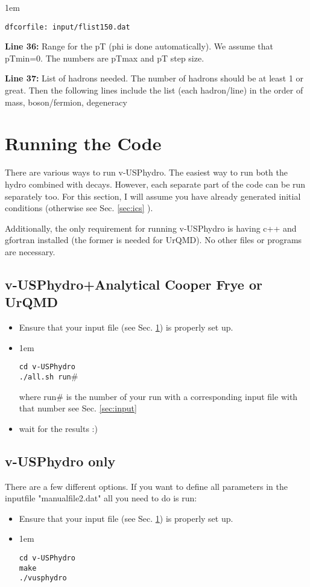 \documentclass[article]{revtex4-1}
\newcommand{\code}[1]{\bigskip\noindent\begin{addmargin}[3em]{1em}\begin{linenumbers}\texttt{#1}\end{linenumbers}\end{addmargin}\bigskip}
\begin{document}
\code{df\textunderscore cor\textunderscore file: input/flist150.dat }

{\bf Line 36:} Range for the pT (phi is done automatically).  We assume that pTmin=0.  The numbers are pTmax and pT step size.

{\bf Line 37:} List of hadrons needed.  The number of hadrons should be at least 1 or great.  Then the following lines include the list (each hadron/line) in the order of mass, boson/fermion, degeneracy



\section{Running the Code}\label{sec:run}

There are various ways to run v-USPhydro.  The easiest way to run both the hydro combined with decays.  However, each separate part of the code can be run separately too. For this section, I will assume you have already generated initial conditions (otherwise see Sec. \ref{sec:ics} ).  

Additionally, the only requirement for running v-USPhydro is having c++ and gfortran installed (the former is needed for UrQMD).  No other files or programs are necessary.

\subsection{v-USPhydro+Analytical Cooper Frye or UrQMD}

\begin{itemize}
\item Ensure that your input file (see Sec. \ref{sec:run}) is properly set up.
\item \code{cd v-USPhydro\\
./all.sh run$\#$}
where run$\#$ is the number of your run with a corresponding input file with that number see Sec. \ref{sec:input}
\item wait for the results :)
\end{itemize}

\subsection{v-USPhydro only}

There are a few different options.  If you want to define all parameters in the inputfile "manualfile2.dat" all you need to do is run:

\begin{itemize}
\item Ensure that your input file (see Sec. \ref{sec:run}) is properly set up.
\item \code{cd v-USPhydro\\
make\\
./vusphydro
}
\end{itemize}
\end{document}
